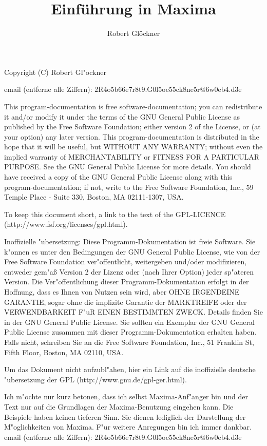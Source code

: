 \documentclass[spanish,12pt,a4paper]{article}
\title{\textbf{\Huge{Einf\"{u}hrung in Maxima}}}
\author{Robert Gl\"{o}ckner}
\begin{document}
\maketitle

\tableofcontents


Copyright (C) Robert Gl"ockner

email (entferne alle Ziffern): 2R4o5b66e7r8t9.G0l5oe55ck8ne5r@6w0eb4.d3e

\scriptsize
This program-documentation is free software-documentation; you can redistribute it and/or modify it under the terms of the GNU General Public License as published by the Free Software Foundation; either version 2 of the License, or (at your option) any later version.
This program-documentation is distributed in the hope that it will be useful, but WITHOUT ANY WARRANTY; without even the implied warranty of MERCHANTABILITY or FITNESS FOR A PARTICULAR PURPOSE. See the GNU General Public License for more details.
You should have received a copy of the GNU General Public License along with this program-documentation; if not, write to the Free Software Foundation, Inc., 59 Temple Place - Suite 330, Boston, MA 02111-1307, USA.

To keep this document short, a link to the text of the GPL-LICENCE (http://www.fsf.org/licenses/gpl.html).

Inoffizielle "ubersetzung: Diese Programm-Dokumentation ist freie Software. Sie k"onnen es unter den Bedingungen der GNU General Public License, wie von der Free Software Foundation ver"offentlicht, weitergeben und/oder modifizieren, entweder gem"a{\ss} Version 2 der Lizenz oder (nach Ihrer Option) jeder sp"ateren Version.
Die Ver"offentlichung dieser Programm-Dokumentation erfolgt in der Hoffnung, dass es Ihnen von Nutzen sein wird, aber OHNE IRGENDEINE GARANTIE, sogar ohne die implizite Garantie der MARKTREIFE oder der VERWENDBARKEIT F"uR EINEN BESTIMMTEN ZWECK. Details finden Sie in der GNU General Public License.
Sie sollten ein Exemplar der GNU General Public License zusammen mit dieser Programm-Dokumentation erhalten haben. Falls nicht, schreiben Sie an die Free Software Foundation, Inc., 51 Franklin St, Fifth Floor, Boston, MA 02110, USA.

Um das Dokument nicht aufzubl"ahen, hier ein Link auf die inoffizielle deutsche "ubersetzung der GPL (http://www.gnu.de/gpl-ger.html).
\normalsize

Ich m"ochte nur kurz betonen, dass ich selbst Maxima-Anf"anger bin und der Text nur auf die Grundlagen der Maxima-Benutzung eingehen kann. Die Beispiele haben keinen tieferen Sinn. Sie dienen lediglich der Darstellung der M"oglichkeiten von Maxima.
F"ur weitere Anregungen bin ich immer dankbar.
email (entferne alle Ziffern): 2R4o5b66e7r8t9.G0l5oe55ck8ne5r@6w0eb4.d3e
\end{document}
